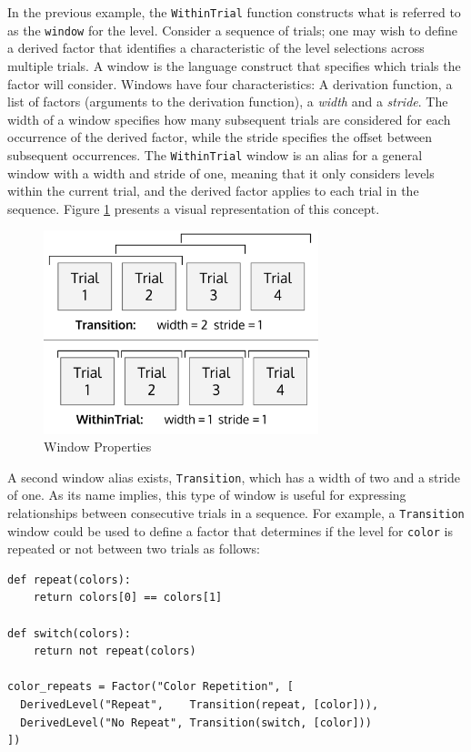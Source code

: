 In the previous example, the \texttt{WithinTrial} function constructs what is referred to as the \texttt{window} for the level. Consider a sequence of trials; one may wish to define a derived factor that identifies a characteristic of the level selections across multiple trials. A window is the language construct that specifies which trials the factor will consider. Windows have four characteristics: A derivation function, a list of factors (arguments to the derivation function), a \textit{width} and a \textit{stride}. The width of a window specifies how many subsequent trials are considered for each occurrence of the derived factor, while the stride specifies the offset between subsequent occurrences. The \texttt{WithinTrial} window is an alias for a general window with a width and stride of one, meaning that it only considers levels within the current trial, and the derived factor applies to each trial in the sequence. Figure \ref{fig:windows} presents a visual representation of this concept.

\begin{figure}[b]
\centering
\centerline{\includegraphics[origin=c,width=8cm]{../figures/windows.png}}
\caption{Window Properties}
\label{fig:windows}
\end{figure}

A second window alias exists, \texttt{Transition}, which has a width of two and a stride of one. As its name implies, this type of window is useful for expressing relationships between consecutive trials in a sequence. For example, a \texttt{Transition} window could be used to define a factor that determines if the level for \texttt{color} is repeated or not between two trials as follows:

\begin{verbatim}
def repeat(colors):
    return colors[0] == colors[1]

def switch(colors):
    return not repeat(colors)

color_repeats = Factor("Color Repetition", [
  DerivedLevel("Repeat",    Transition(repeat, [color])),
  DerivedLevel("No Repeat", Transition(switch, [color]))
])
\end{verbatim}

